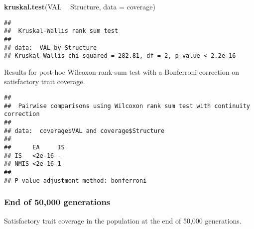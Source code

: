 \documentclass[]{book}
\newenvironment{Shaded}{\begin{snugshade}}{\end{snugshade}}
\newcommand{\DataTypeTok}[1]{\textcolor[rgb]{0.13,0.29,0.53}{#1}}
\newcommand{\KeywordTok}[1]{\textcolor[rgb]{0.13,0.29,0.53}{\textbf{#1}}}
\newcommand{\NormalTok}[1]{#1}
\newcommand{\OperatorTok}[1]{\textcolor[rgb]{0.81,0.36,0.00}{\textbf{#1}}}
\newcommand{\OtherTok}[1]{\textcolor[rgb]{0.56,0.35,0.01}{#1}}
\newcommand{\StringTok}[1]{\textcolor[rgb]{0.31,0.60,0.02}{#1}}
\begin{document}
\begin{Shaded}
\begin{Highlighting}[]
\KeywordTok{kruskal.test}\NormalTok{(VAL }\OperatorTok{~}\StringTok{ }\NormalTok{Structure, }\DataTypeTok{data =}\NormalTok{ coverage)}
\end{Highlighting}
\end{Shaded}

\begin{verbatim}
## 
##  Kruskal-Wallis rank sum test
## 
## data:  VAL by Structure
## Kruskal-Wallis chi-squared = 282.81, df = 2, p-value < 2.2e-16
\end{verbatim}

Results for post-hoc Wilcoxon rank-sum test with a Bonferroni correction on satisfactory trait coverage.

\begin{Shaded}
\end{Shaded}

\begin{verbatim}
## 
##  Pairwise comparisons using Wilcoxon rank sum test with continuity correction 
## 
## data:  coverage$VAL and coverage$Structure 
## 
##      EA     IS
## IS   <2e-16 - 
## NMIS <2e-16 1 
## 
## P value adjustment method: bonferroni
\end{verbatim}

\hypertarget{end-of-50000-generations-2}{%
\subsubsection{End of 50,000 generations}\label{end-of-50000-generations-2}}

Satisfactory trait coverage in the population at the end of 50,000 generations.
\end{document}
